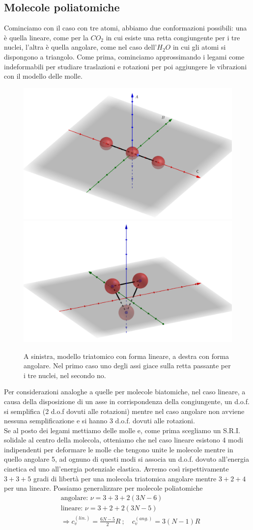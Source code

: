 \documentclass[10pt,a4paper]{article}
\begin{document}
\subsection{Molecole poliatomiche}
Cominciamo con il caso con tre atomi, abbiamo due conformazioni possibili: una è quella lineare, come per la $CO_2$ in cui esiste una retta congiungente per i tre nuclei, l'altra è quella angolare, come nel caso dell'$H_2O$ in cui gli atomi si dispongono a triangolo. Come prima, cominciamo approssimando i legami come indeformabili per studiare traslazioni e rotazioni per poi aggiungere le vibrazioni con il modello delle molle.
\begin{figure}
	\centering
	\includegraphics[width=0.4\linewidth]{../images/modello_triatomico1} \quad
	\includegraphics[width=0.4\linewidth]{../images/modello_triatomico2}
	\caption{A sinistra, modello triatomico con forma lineare, a destra con forma angolare. Nel primo caso uno degli assi giace sulla retta passante per i tre nuclei, nel secondo no.}
\end{figure}
\FloatBarrier
Per considerazioni analoghe a quelle per molecole biatomiche, nel caso lineare, a causa della disposizione di un asse in corrispondenza della congiungente, un d.o.f. si semplifica (2 d.o.f dovuti alle rotazioni) mentre nel caso angolare non avviene nessuna semplificazione e si hanno 3 d.o.f. dovuti alle rotazioni.\\
Se al posto dei legami mettiamo delle molle e, come prima scegliamo un S.R.I. solidale al centro della molecola, otteniamo che nel caso lineare esistono 4 modi indipendenti per deformare le molle che tengono unite le molecole mentre in quello angolare 5, ad ognuno di questi modi  si associa un d.o.f. dovuto all'energia cinetica ed uno all'energia potenziale elastica. Avremo così rispettivamente $3+3+5$ gradi di libertà per una molecola triatomica angolare mentre $3+2+4$ per una lineare. Possiamo generalizzare per molecole poliatomiche
\begin{align*}
	&\text{angolare: } \nu = 3+3+2(3N-6)\\
	&\text{lineare: } \nu = 3+2+2(3N-5)\\
	&\Rightarrow c_v^{(lin.)} = \frac{6N-5}{2}R\ ;\quad c_v^{(ang.)}=3(N-1)R	
\end{align*}
\end{document}
